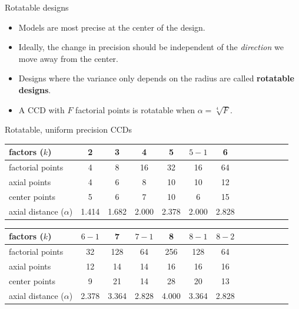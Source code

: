 \documentclass[10pt]{beamer}
\begin{document}
\begin{frame}{Rotatable designs}

\begin{itemize}
	\item Models are most precise at the center of the design.
	\item<2-> Ideally, the change in precision should be independent of the \emph{direction} we move away from the center.
\end{itemize}



\begin{itemize}
	\item<4-> Designs where the variance only depends on the radius are called \textbf{rotatable designs}.
	\item<5-> A CCD with $F$ factorial points is rotatable when $\alpha=\sqrt[4]{F}$.
\end{itemize}
\end{frame}

\begin{frame}{Rotatable, uniform precision CCDs}
	\begin{tabular}{lcccccccccccc}
	  factors ($k$) & 2 & 3 & 4 & 5 & $5-1$ & 6 \\
	  \hline
	  factorial points & 4 & 8 & 16 & 32 & 16 & 64 \\
	  axial points & 4 & 6 & 8 & 10 & 10 & 12 \\
	  center points & 5 & 6 & 7 & 10 & 6 & 15 \\
	  axial distance ($\alpha$) & 1.414 & 1.682 & 2.000 & 2.378 & 2.000 & 2.828
	\end{tabular}

	\bigskip\bigskip
	\begin{tabular}{lcccccccccccc}
	  factors ($k$) & $6-1$ & 7 & $7-1$ & 8 & $8-1$ & $8-2$ \\
	  \hline
	  factorial points & 32 & 128 & 64 & 256 & 128 & 64 \\
	  axial points & 12 & 14 & 14 & 16 & 16 & 16 \\
	  center points & 9 & 21 & 14 & 28 & 20 & 13 \\
	  axial distance ($\alpha$) & 2.378 & 3.364 & 2.828 & 4.000 & 3.364 & 2.828
	\end{tabular}
\end{frame}
\end{document}
